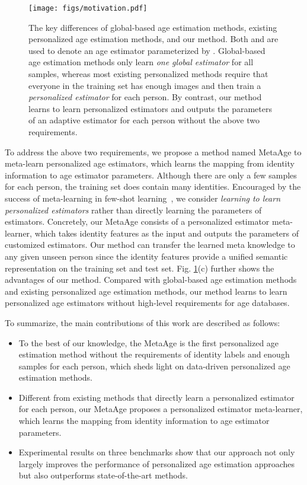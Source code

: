 \documentclass[journal,twoside]{IEEEtran}
\begin{document}
\begin{figure}[t]
  \centering
  \texttt{[image: figs/motivation.pdf]}
  \caption{The key differences of global-based age estimation methods, existing personalized age estimation methods, and our method. Both  and  are used to denote an age estimator parameterized by . Global-based age estimation methods only learn \emph{one global estimator} for all samples, whereas most existing personalized methods require that everyone in the training set has enough images and then train a \emph{personalized estimator} for each person. By contrast, our method learns to learn personalized estimators and outputs the parameters of an adaptive estimator for each person without the above two requirements.}
  \label{fig:introduction}
\end{figure}


To address the above two requirements, we propose a method named MetaAge to meta-learn personalized age estimators, which learns the mapping from identity information to age estimator parameters.
Although there are only a few samples for each person, the training set does contain many identities. Encouraged by the success of meta-learning in few-shot learning~\cite{finn2017model}, we consider \emph{learning to learn personalized estimators} rather than directly learning the parameters of estimators. Concretely, our MetaAge consists of a personalized estimator meta-learner, which takes identity features as the input and outputs the parameters of customized estimators. Our method can transfer the learned meta knowledge to any given unseen person since the identity features provide a unified semantic representation on the training set and test set. 
Fig. \ref{fig:introduction}(c) further shows the advantages of our method.  Compared with global-based age estimation methods and existing personalized age estimation methods,  our method learns to learn personalized age estimators without high-level requirements for age databases.


To summarize, the main contributions of this work are described as follows:

\begin{itemize}
\item
  To the best of our knowledge, the MetaAge is the first personalized age estimation method without the requirements of identity labels and enough samples for each person, which sheds light on data-driven personalized age estimation methods.
\item
  Different from existing methods that directly learn a personalized estimator for each person, our MetaAge proposes a personalized estimator meta-learner, which learns the mapping from identity information to age estimator parameters.
\item
  Experimental results on three benchmarks show that our approach not only largely improves the performance of personalized age estimation approaches but also outperforms state-of-the-art methods.

\end{itemize}
\end{document}
